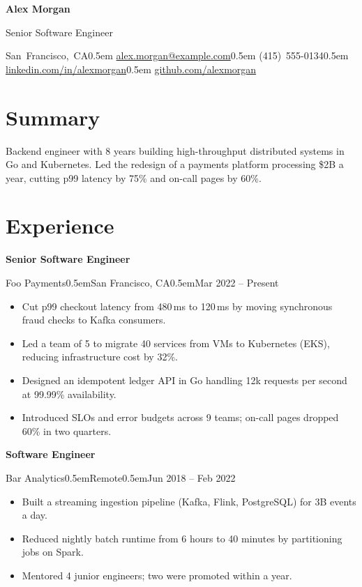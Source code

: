 \documentclass[10pt]{article}
\newcommand{\sep}{\unskip\kern0.5em{\color{subtle}\textbar}\hspace{0.5em}}
\newcommand{\role}[4]{%
  {\bfseries #1}\par
  {#3}{\color{subtle}\sep #4\sep #2}\par}
\begin{document}
{\fontsize{24}{28}\selectfont\bfseries Alex Morgan}\par\vspace{2pt}
{\large\color{accent} Senior Software Engineer}\par\vspace{4pt}
\mbox{San Francisco, CA}\sep
\mbox{\href{mailto:alex.morgan@example.com}{alex.morgan@example.com}}\sep
\mbox{(415) 555-0134}\sep
\mbox{\href{https://linkedin.com/in/alexmorgan}{linkedin.com/in/alexmorgan}}\sep
\mbox{\href{https://github.com/alexmorgan}{github.com/alexmorgan}}\par

\section{Summary}
Backend engineer with 8 years building high-throughput distributed systems in Go and Kubernetes.
Led the redesign of a payments platform processing \$2B a year, cutting p99 latency by 75\% and
on-call pages by 60\%.

\section{Experience}
\role{Senior Software Engineer}{Mar 2022 -- Present}{Foo Payments}{San Francisco, CA}
\begin{itemize}
  \item Cut p99 checkout latency from 480\,ms to 120\,ms by moving synchronous fraud checks to Kafka consumers.
  \item Led a team of 5 to migrate 40 services from VMs to Kubernetes (EKS), reducing infrastructure cost by 32\%.
  \item Designed an idempotent ledger API in Go handling 12k requests per second at 99.99\% availability.
  \item Introduced SLOs and error budgets across 9 teams; on-call pages dropped 60\% in two quarters.
\end{itemize}

\vspace{4pt}
\role{Software Engineer}{Jun 2018 -- Feb 2022}{Bar Analytics}{Remote}
\begin{itemize}
  \item Built a streaming ingestion pipeline (Kafka, Flink, PostgreSQL) for 3B events a day.
  \item Reduced nightly batch runtime from 6 hours to 40 minutes by partitioning jobs on Spark.
  \item Mentored 4 junior engineers; two were promoted within a year.
\end{itemize}
\end{document}
